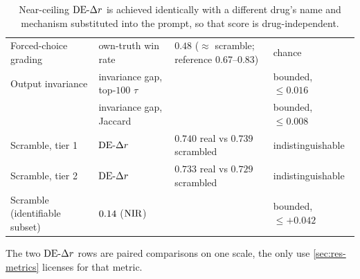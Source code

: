 \begin{table}[htbp]
\caption{ Near-ceiling $\DEdr$ is achieved identically with a different drug's name and mechanism substituted into the prompt, so that score is drug-independent.}
\label{tab:blind}
\begin{fullwidth}
\begin{threeparttable}
\begin{tabularx}{\linewidth}{@{}L{29mm} L{38mm} Y L{28mm}@{}}
 &  &  &  \\
\midrule
Forced-choice grading & own-truth win rate
  & $0.48$ ($\approx$ scramble; reference 0.67--0.83) & chance \\
\addlinespace[10pt]
Output invariance & invariance gap, top-$100$ $\tau$ & 
  & bounded, $\leq 0.016$ \\
 & invariance gap, Jaccard & 
  & bounded, $\leq 0.008$ \\
\addlinespace[10pt]
Scramble, tier 1 & $\DEdr$ & $0.740$ real vs $0.739$ scrambled
  & indistinguishable \\
Scramble, tier 2 & $\DEdr$ & $0.733$ real vs $0.729$ scrambled
  & indistinguishable \\
Scramble (identifiable subset) & $0.14$ ($\textrm{NIR}$) & 
  & bounded, $\leq +0.042$ \\
\end{tabularx}
\begin{tablenotes}[flushleft]
\item The two $\DEdr$ rows are paired comparisons on one scale, the only use
\cref{sec:res-metrics} licenses for that metric.
\end{tablenotes}
\end{threeparttable}
\end{fullwidth}
\end{table}

